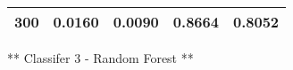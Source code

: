\documentclass[11pt]{article}
\begin{document}
\begin{longtable}[]{@{}ccccc@{}}
\begin{minipage}[t]{0.16\columnwidth}\centering\strut
300\strut
\end{minipage} & \begin{minipage}[t]{0.21\columnwidth}\centering\strut
0.0160\strut
\end{minipage} & \begin{minipage}[t]{0.20\columnwidth}\centering\strut
0.0090\strut
\end{minipage} & \begin{minipage}[t]{0.15\columnwidth}\centering\strut
0.8664\strut
\end{minipage} & \begin{minipage}[t]{0.14\columnwidth}\centering\strut
0.8052\strut
\end{minipage}\tabularnewline
\bottomrule
\end{longtable}

** Classifer 3 - Random Forest **
\end{document}
